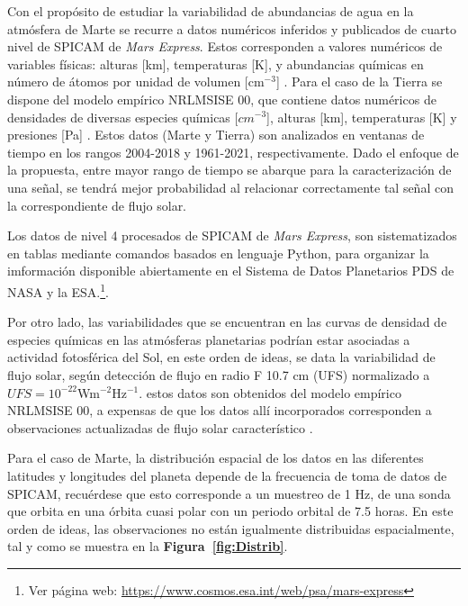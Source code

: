\documentclass[a4paper,alpha-refs]{eSpectra}
\begin{document}
Con el prop\'osito de estudiar la variabilidad de abundancias de agua en la atm\'osfera de Marte se recurre a datos num\'ericos inferidos  y publicados de cuarto nivel de SPICAM de \textit{Mars Express}. Estos corresponden a valores num\'ericos de variables f\'isicas: alturas [km], temperaturas [K], y abundancias qu\'imicas en n\'umero de \'atomos por unidad de volumen [cm$^{-3}$] \citep{spicam_fedorova_H2O_2021}. Para el caso de la Tierra se dispone del modelo emp\'irico NRLMSISE 00, que contiene datos num\'ericos de densidades de diversas especies qu\'imicas [$cm^{-3}$], alturas [km], temperaturas [K] y presiones [Pa] \citep{NRLMSISE_2002}. Estos datos (Marte y Tierra) son analizados en ventanas de tiempo en los rangos 2004-2018 y 1961-2021, respectivamente. Dado el enfoque de la propuesta, entre mayor rango de tiempo se abarque para la caracterizaci\'on de una se\~nal, se tendrá mejor probabilidad al relacionar correctamente tal se\~nal con la correspondiente de flujo solar.

Los datos de nivel 4 procesados de SPICAM de \textit{Mars Express}, son sistematizados en tablas mediante comandos basados en lenguaje Python, para organizar la imformaci\'on disponible abiertamente en  el Sistema de Datos Planetarios PDS de NASA y la ESA.\footnote{Ver p\'agina web: \url{https://www.cosmos.esa.int/web/psa/mars-express}}.

Por otro lado, las variabilidades que se encuentran en las curvas de densidad de especies qu\'imicas en las atm\'osferas planetarias podr\'ian estar asociadas a actividad fotosf\'erica del Sol, en este orden de ideas, se data la variabilidad de flujo solar, seg\'un detecci\'on de flujo en radio F 10.7 cm (UFS) normalizado a  $UFS=10^{-22}$Wm$^{-2}$Hz$^{-1}$. estos datos son obtenidos del  modelo emp\'irico NRLMSISE 00, a expensas de que los datos all\'i incorporados corresponden a observaciones actualizadas de flujo solar caracter\'istico \citep{NRLMSISE_2021}. 

Para el caso de Marte, la distribuci\'on espacial de los datos en las diferentes latitudes y longitudes del planeta depende de la frecuencia de toma de datos de SPICAM, recu\'erdese que esto corresponde a un muestreo de 1 Hz, de una sonda que orbita en una \'orbita cuasi polar con un periodo orbital de 7.5 horas. En este orden de ideas, las observaciones no est\'an igualmente distribuidas espacialmente, tal y como se muestra en la \textbf{Figura~\ref{fig:Distrib}}. 
\end{document}
